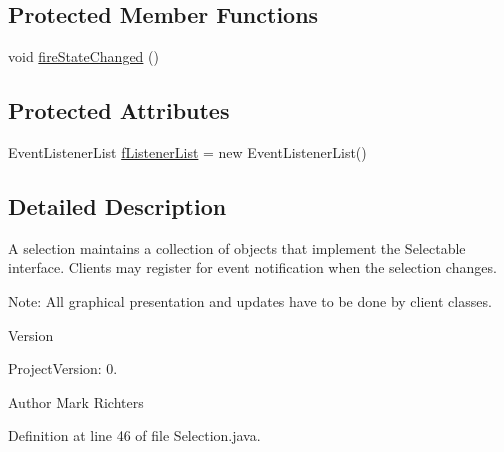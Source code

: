 \subsection*{Protected Member Functions}
\begin{DoxyCompactItemize}
\item 
void \hyperlink{classorg_1_1tzi_1_1use_1_1gui_1_1util_1_1_selection_3_01_t_01extends_01_selectable_01_4_a4cba23829869524d13a7ac3dc6663fb0}{fire\-State\-Changed} ()
\end{DoxyCompactItemize}
\subsection*{Protected Attributes}
\begin{DoxyCompactItemize}
\item 
Event\-Listener\-List \hyperlink{classorg_1_1tzi_1_1use_1_1gui_1_1util_1_1_selection_3_01_t_01extends_01_selectable_01_4_afa90c9be53d9dc2075b8fad59645ec1f}{f\-Listener\-List} = new Event\-Listener\-List()
\end{DoxyCompactItemize}


\subsection{Detailed Description}
A selection maintains a collection of objects that implement the {\ttfamily Selectable} interface. Clients may register for event notification when the selection changes.

Note\-: All graphical presentation and updates have to be done by client classes.

\begin{DoxyVersion}{Version}

\end{DoxyVersion}
\begin{DoxyParagraph}{Project\-Version\-:}
0. 
\end{DoxyParagraph}
\begin{DoxyAuthor}{Author}
Mark Richters 
\end{DoxyAuthor}


Definition at line 46 of file Selection.\-java.



